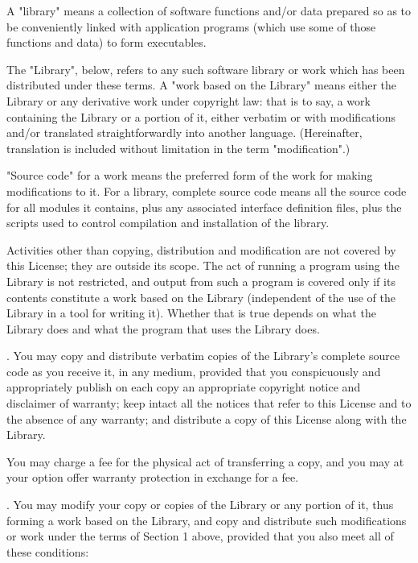 A "library" means a collection of software functions and/or data prepared so as to be conveniently linked with application programs (which use some of those functions and data) to form executables. 

The "Library", below, refers to any such software library or work which has been distributed under these terms. A "work based on the Library" means either the Library or any derivative work under copyright law: that is to say, a work containing the Library or a portion of it, either verbatim or with modifications and/or translated straightforwardly into another language. (Hereinafter, translation is included without limitation in the term "modification".) 

"Source code" for a work means the preferred form of the work for making modifications to it. For a library, complete source code means all the source code for all modules it contains, plus any associated interface definition files, plus the scripts used to control compilation and installation of the library. 

Activities other than copying, distribution and modification are not covered by this License; they are outside its scope. The act of running a program using the Library is not restricted, and output from such a program is covered only if its contents constitute a work based on the Library (independent of the use of the Library in a tool for writing it). Whether that is true depends on what the Library does and what the program that uses the Library does. 

. You may copy and distribute verbatim copies of the Library's complete source code as you receive it, in any medium, provided that you conspicuously and appropriately publish on each copy an appropriate copyright notice and disclaimer of warranty; keep intact all the notices that refer to this License and to the absence of any warranty; and distribute a copy of this License along with the Library. 

You may charge a fee for the physical act of transferring a copy, and you may at your option offer warranty protection in exchange for a fee. 

. You may modify your copy or copies of the Library or any portion of it, thus forming a work based on the Library, and copy and distribute such modifications or work under the terms of Section 1 above, provided that you also meet all of these conditions: 

